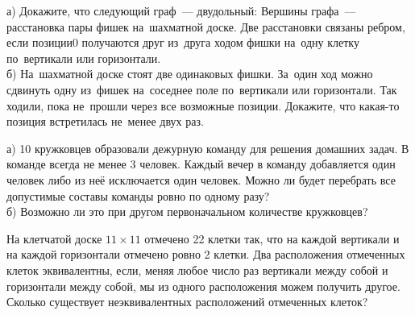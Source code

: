 \begin{problems}

\item а) Докажите, что следующий граф~--- двудольный:
Вершины графа~--- расстановка пары фишек на~шахматной доске. Две расстановки связаны ребром, если позиции0 получаются друг из~друга ходом фишки на~одну клетку по~вертикали или горизонтали.\\
б) На~шахматной доске стоят две одинаковых фишки.
За~один ход можно сдвинуть одну из~фишек на~соседнее поле по~вертикали или горизонтали. Так ходили, пока не~прошли через все возможные позиции. Докажите, что какая-то позиция встретилась не~менее двух раз.

\item а) 10 кружковцев образовали дежурную команду для решения домашних задач. В команде всегда не менее 3 человек. Каждый вечер в команду добавляется один человек либо из неё исключается один человек. Можно ли будет перебрать все допустимые составы команды ровно по одному разу?\\
б) Возможно ли это при другом первоначальном количестве кружковцев?

\item На клетчатой доске $11\times 11$ отмечено 22 клетки так, что на каждой вертикали и на каждой горизонтали отмечено ровно 2 клетки. Два расположения отмеченных клеток эквивалентны, если, меняя любое число раз вертикали между собой и горизонтали между собой, мы из одного расположения можем получить другое. Сколько существует неэквивалентных расположений отмеченных клеток?
\end{problems}
